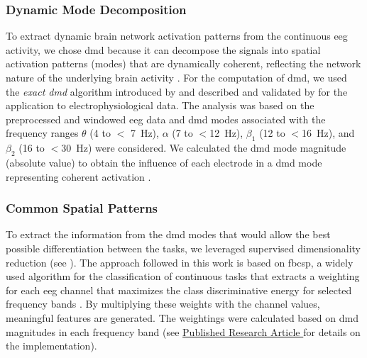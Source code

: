 \subsubsection{Dynamic Mode Decomposition}
To extract dynamic brain network activation patterns from the continuous \gls{eeg} activity, we chose \gls{dmd} because it can decompose the signals into spatial activation patterns (modes) that are dynamically coherent, reflecting the network nature of the underlying brain activity \cite{Brunton2016}. For the computation of \gls{dmd}, we used the \textit{exact \gls{dmd}} algorithm introduced by \citeauthor{Tu2014} \cite{Tu2014} and described and validated by \citeauthor{Brunton2016} \cite{Brunton2016} for the application to electrophysiological data. The analysis was based on the preprocessed and windowed \gls{eeg} data and \gls{dmd} modes associated with the frequency ranges $\theta$ (4 to $<$ 7~Hz), $\alpha$ (7 to $<$12~Hz), $\beta_1$ (12 to $<$16~Hz), and $\beta_2$ (16 to $<$30~Hz) were considered. We calculated the \gls{dmd} mode magnitude (absolute value) to obtain the influence of each electrode in a \gls{dmd} mode representing coherent activation \cite{Brunton2016}.

\subsubsection{Common Spatial Patterns}
To extract the information from the \gls{dmd} modes that would allow the best possible differentiation between the tasks, we leveraged supervised dimensionality reduction (see ). The approach followed in this work is based on \gls{fbcsp}, a widely used algorithm for the classification of continuous tasks that extracts a weighting for each \gls{eeg} channel that maximizes the class discriminative energy for selected frequency bands \cite{Ang2012}. By multiplying these weights with the channel values, meaningful features are generated. The weightings were calculated based on \gls{dmd} magnitudes in each frequency band (see \hyperref[pub:paperI]{Published Research Article } for details on the implementation).


